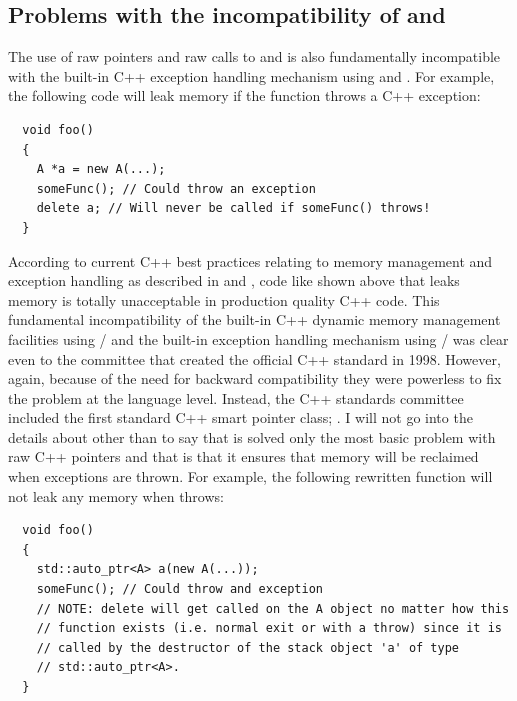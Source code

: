 \documentclass[pdf,ps2pdf,11pt]{SANDreport}
\begin{document}
%
{}\subsection{Problems with the incompatibility of
{} and {}}
%

The use of raw pointers and raw calls to {} and
{} is also fundamentally incompatible with the built-in
C++ exception handling mechanism using {} and
{}.  For example, the following code will leak memory
if the function {} throws a C++ exception:

{\small\begin{verbatim}
  void foo()
  {
    A *a = new A(...);
    someFunc(); // Could throw an exception
    delete a; // Will never be called if someFunc() throws!
  }
\end{verbatim}}

According to current C++ best practices relating to memory management
and exception handling as described in {}\cite[Item
{}\#29]{EffectiveC++ThirdEdition} and {}\cite[Item
{}\#71]{C++CodingStandards05}, code like shown above that leaks memory
is totally unacceptable in production quality C++ code.  This
fundamental incompatibility of the built-in C++ dynamic memory
management facilities using {}/ and the
built-in exception handling mechanism using
{}/ was clear even to the committee that
created the official C++ standard in 1998.  However, again, because of
the need for backward compatibility they were powerless to fix the
problem at the language level.  Instead, the C++ standards committee
included the first standard C++ smart pointer class;
{}.  I will not go into the details about
{} other than to say that is solved only the most
basic problem with raw C++ pointers and that is that it ensures that
memory will be reclaimed when exceptions are thrown.  For example, the
following rewritten function will not leak any memory when
{} throws:

{\small\begin{verbatim}
  void foo()
  {
    std::auto_ptr<A> a(new A(...));
    someFunc(); // Could throw and exception
    // NOTE: delete will get called on the A object no matter how this
    // function exists (i.e. normal exit or with a throw) since it is
    // called by the destructor of the stack object 'a' of type
    // std::auto_ptr<A>. 
  }
\end{verbatim}}
\end{document}
